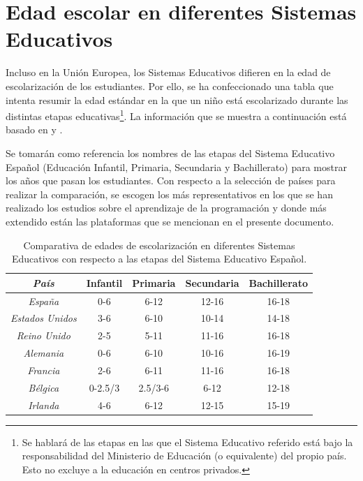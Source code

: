 
\appendix

\chapter{Edad escolar en diferentes Sistemas Educativos}\label{anexo:edad-educacion}

Incluso en la Unión Europea, los Sistemas Educativos difieren en la edad de escolarización de los estudiantes. Por ello, se ha confeccionado una tabla que intenta resumir la edad estándar en la que un niño está escolarizado durante las distintas etapas educativas\footnote{Se hablará de las etapas en las que el Sistema Educativo referido está bajo la responsabilidad del Ministerio de Educación (o equivalente) del propio país. Esto no excluye a la educación en centros privados.}. La información que se muestra a continuación está basado en \cite{cursos-educacion-europa} y \cite{guide-education-us}.

Se tomarán como referencia los nombres de las etapas del Sistema Educativo Español (Educación Infantil, Primaria, Secundaria y Bachillerato) para mostrar los años que pasan los estudiantes. Con respecto a la selección de países para realizar la comparación, se escogen los más representativos en los que se han realizado los estudios sobre el aprendizaje de la programación y donde más extendido están las plataformas que se mencionan en el presente documento. 


\begin{table}[!ht]
	\begin{centering}
		\begin{tabular}{c|c|c|c|c}
\emph{País} & Infantil & Primaria & Secundaria & Bachillerato\\
\hline
\emph{España} & 0-6 & 6-12 & 12-16 & 16-18\\
\emph{Estados Unidos} & 3-6 & 6-10 & 10-14 & 14-18\\
\emph{Reino Unido} & 2-5 & 5-11 & 11-16 & 16-18\\
\emph{Alemania} & 0-6 & 6-10 & 10-16 & 16-19\\
\emph{Francia} & 2-6 & 6-11 & 11-16 & 16-18\\
\emph{Bélgica} & 0-2.5/3 & 2.5/3-6 & 6-12 & 12-18\\
\emph{Irlanda} & 4-6 & 6-12 & 12-15 & 15-19\\
\end{tabular}
	\caption{Comparativa de edades de escolarización en diferentes Sistemas Educativos con respecto a las etapas del Sistema Educativo Español.}
		\label{tab:comparativa-tecnicas}
	\end{centering}
\end{table}


